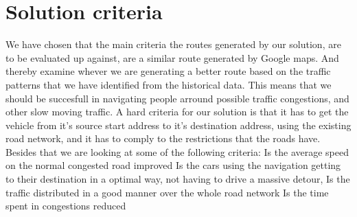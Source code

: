 \section{Solution criteria}
We have chosen that the main criteria the routes generated by our solution, are to be evaluated up against, are a similar route generated by Google maps. And thereby examine whever we are generating a better route based on the traffic patterns that we have identified from the historical data. This means that we should be succesfull in navigating people arround possible traffic congestions, and other slow moving traffic. A hard criteria for our solution is that it has to get the vehicle from it's source start address to it's destination address, using the existing road network, and it has to comply to the restrictions that the roads have.
Besides that we are looking at some of the following criteria:
Is the average speed on the normal congested road improved
Is the cars using the navigation getting to their destination in a optimal way, not having to drive a massive detour,
Is the traffic distributed in a good manner over the whole road network
Is the time spent in congestions reduced